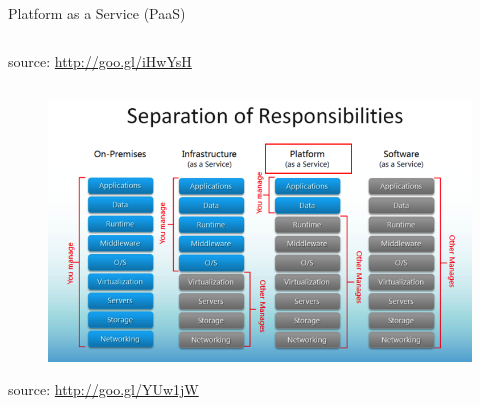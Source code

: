 \begin{frame}{Platform as a Service (PaaS)}
{\begin{columns}
\begin{column}{0.45\textwidth}
\begin{flushright}
					\tiny{source: \url{http://goo.gl/iHwYsH}}
				\end{flushright}
			\end{column}
		\end{columns}
	}
	{
		\begin{figure}
			\centering{}
			\includegraphics[scale=0.33]{images/separation-responsabilities.png}
		\end{figure}
		\begin{flushright}
			\tiny{source: \url{http://goo.gl/YUw1jW}}
		\end{flushright}
	}
\end{frame}

